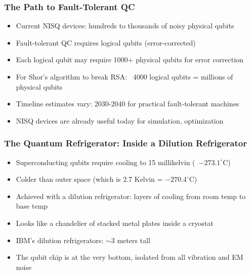 \begin{frame}[fragile]\frametitle{The Path to Fault-Tolerant QC}
\begin{itemize}
\item Current NISQ devices: hundreds to thousands of noisy physical qubits
\item Fault-tolerant QC requires logical qubits (error-corrected)
\item Each logical qubit may require 1000+ physical qubits for error correction
\item For Shor's algorithm to break RSA: ~4000 logical qubits = millions of physical qubits
\item Timeline estimates vary: 2030-2040 for practical fault-tolerant machines
\item NISQ devices are already useful today for simulation, optimization
\end{itemize}
\end{frame}

\begin{frame}[fragile]\frametitle{The Quantum Refrigerator: Inside a Dilution Refrigerator}
\begin{itemize}
\item Superconducting qubits require cooling to 15 millikelvin (~$-273.1^\circ$C)
\item Colder than outer space (which is 2.7 Kelvin = $-270.4^\circ$C)
\item Achieved with a dilution refrigerator: layers of cooling from room temp to base temp
\item Looks like a chandelier of stacked metal plates inside a cryostat
\item IBM's dilution refrigerators: $\sim$3 meters tall
\item The qubit chip is at the very bottom, isolated from all vibration and EM noise
\end{itemize}
\end{frame}


